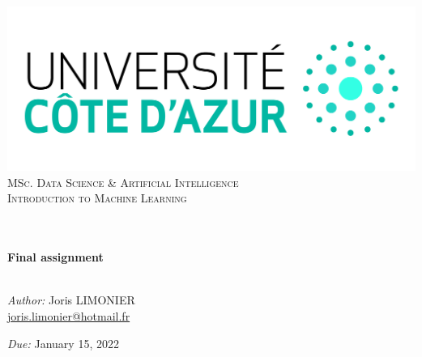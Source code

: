 \begin{titlepage}
	\begin{center}
		\includegraphics[width=\textwidth]{images/logo_uca.jpeg}\\[0.1cm]
		\vspace{1.5cm}
		\textsc{\Large MSc. Data Science \& Artificial Intelligence}\\[1.2cm]
		\textsc{\Large Introduction to Machine Learning}\\[1.2cm]
		\\
		\vspace{1cm}
		
		\HRule \\[0.6cm]
		{\huge \bfseries Final assignment}\\[0.4cm]
		\HRule \\[1.5cm]
		\vspace{1cm}
		
		\vfill
		\large
		\emph{Author:} Joris LIMONIER\\
		\vspace{.2cm}
		\href{mailto:joris.limonier@hotmail.fr}{joris.limonier@hotmail.fr}\\
		\vspace{.2cm}


		\emph{Due:} {\large January 15, 2022}
	\end{center}
\end{titlepage}


